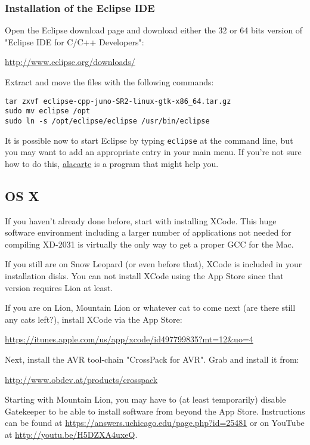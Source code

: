 \subsubsection{Installation of the Eclipse IDE}
\label{eclipseinst}
Open the Eclipse download page and download
either the 32 or 64 bits version of
"Eclipse IDE for C/C++ Developers":

\url{http://www.eclipse.org/downloads/}

Extract and move the files with the following commands:

\begin{verbatim}
tar zxvf eclipse-cpp-juno-SR2-linux-gtk-x86_64.tar.gz 
sudo mv eclipse /opt
sudo ln -s /opt/eclipse/eclipse /usr/bin/eclipse
\end{verbatim}

It is possible now to start Eclipse by typing \texttt{eclipse} at
the command line, but you may want to add an appropriate entry
in your main menu. If you're not sure how to do this,
\href{apt://alacarte}{alacarte} is a program that might help you.

\subsection{OS X}
If you haven't already done before, start with installing XCode. 
This huge software environment including a larger number of applications
not needed for compiling XD-2031 is virtually the only 
way to get a proper GCC for the Mac.

If you still are on Snow Leopard (or even before that), XCode is
included in your installation disks. You can not install XCode using
the App Store since that version requires Lion at least.

If you are on Lion, Mountain Lion or whatever cat to come next (are
there still any cats left?), install XCode via the App Store:

\url{https://itunes.apple.com/us/app/xcode/id497799835?mt=12&uo=4}

Next, install the AVR tool-chain "CrossPack for AVR". Grab and install it from: 

\url{http://www.obdev.at/products/crosspack}

Starting with Mountain Lion, you may have to (at least temporarily) disable
Gatekeeper to be able to install software from beyond the App Store. Instructions can be found at \url{https://answers.uchicago.edu/page.php?id=25481} or
on YouTube at \url{http://youtu.be/H5DZXA4uxeQ}.

